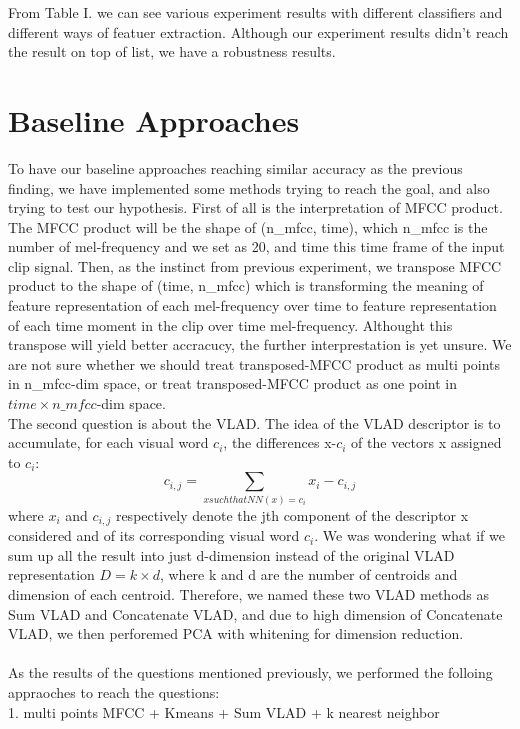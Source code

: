 \documentclass[final]{siamltexmm}
\begin{document}
From Table I. we can see various experiment results with different classifiers and different ways of featuer extraction.  Although our experiment results didn't reach the result on top of list, we have a robustness results.  %

\section{Baseline Approaches}
To have our baseline approaches reaching similar accuracy as the previous finding, we have implemented some methods trying to reach the goal, and also trying to test our hypothesis. First of all is the interpretation of MFCC product. The MFCC product will be the shape of (n\_mfcc, time), which n\_mfcc is the number of mel-frequency and we set as 20, and time this time frame of the input clip signal. Then, as the instinct from previous experiment, we transpose MFCC product to the shape of (time, n\_mfcc) which is transforming the meaning of feature representation of each mel-frequency over time to feature representation of each time moment in the clip over time mel-frequency. Althought this transpose will yield better accracucy, the further interprestation is yet unsure. We are not sure whether we should treat transposed-MFCC product as multi points in n\_mfcc-dim space, or treat transposed-MFCC product as one point in $time \times n\_mfcc$-dim space.
\\The second question is about the VLAD. The idea of the VLAD descriptor is to accumulate, for each visual word $c_{i}$, the differences x-$c_{i}$ of the vectors x assigned to $c_{i}$:
\begin{equation}
c_{i, j} = \sum\limits_{x such that NN(x)=c_{i}} x_{i}-c_{i,j}
\end{equation}
where $x_{i}$ and $c_{i,j}$ respectively denote the jth component of the descriptor x considered and of its corresponding visual word $c_{i}$. We was wondering what if we sum up all the result into just d-dimension instead of the original VLAD representation $D=k\times d$, where k and d are the number of centroids and dimension of each centroid. Therefore, we named these two VLAD methods as Sum VLAD and Concatenate VLAD, and due to high dimension of Concatenate VLAD, we then perforemed PCA with whitening for dimension reduction.
\\\\As the results of the questions mentioned previously, we performed the folloing appraoches to reach the questions:
\\ 1. multi points MFCC + Kmeans + Sum VLAD + k nearest neighbor
\end{document}
